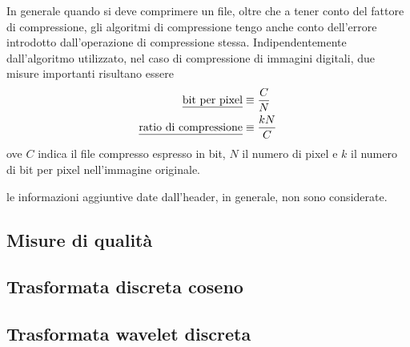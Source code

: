 \documentclass{subfiles}
\begin{document}
In generale quando si deve comprimere un file, oltre che a tener conto del fattore di compressione,
gli algoritmi di compressione tengo anche conto dell'errore introdotto dall'operazione di compressione stessa.
Indipendentemente dall'algoritmo utilizzato, nel caso di compressione di immagini digitali, due misure importanti risultano essere
\[\begin{aligned}
        \text{\underline{bit per pixel}}         & \equiv \frac{C}{N}  \\
        \text{\underline{ratio di compressione}} & \equiv \frac{kN}{C}
    \end{aligned}\]
ove \(C\) indica il file compresso espresso in bit, \(N\) il numero di pixel e \(k\) il numero di bit per pixel nell'immagine originale.

\begin{Note*}
    le informazioni aggiuntive date dall'header, in generale, non sono considerate.
\end{Note*}

\subsection{Misure di qualità}


\subsection{Trasformata discreta coseno}

\clearpage

\subsection{Trasformata wavelet discreta}

\end{document}
